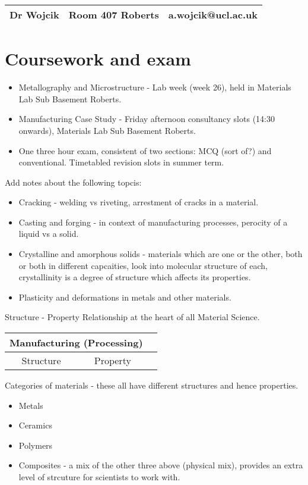 \documentclass[class=report, crop=false, 12pt,a4paper]{standalone}
\begin{document}
\begin{center}
  \begin{tabular}{ |c|c|c| } 
   \hline
   Dr Wojcik & Room 407 Roberts & a.wojcik@ucl.ac.uk \\ 
   \hline
  \end{tabular}
  \end{center}

\section{Coursework and exam}
\begin{itemize}
  \item Metallography and Microstructure - Lab week (week 26), held in Materials Lab Sub Basement Roberts.
  \item Manufacturing Case Study - Friday afternoon consultancy slots (14:30 onwards), Materials Lab Sub Basement Roberts.
  \item One three hour exam, consistent of two sections: MCQ (sort of?) and conventional. Timetabled revision slots in summer term.
\end{itemize}

Add notes about the following topcis: 

\begin{itemize}
  \item Cracking - welding vs riveting, arrestment of cracks in a material. 
  \item Casting and forging - in context of manufacturing processes, perocity of a liquid vs a solid.
  \item Crystalline and amorphous solids -  materials which are one or the other, both or both in different capcaities, look into molecular structure of each, crystallinity is a degree of structure which affects its properties.
  \item Plasticity and deformations in metals and other materials.
\end{itemize}

Structure - Property Relationship at the heart of all Material Science.

\begin{center}
  \begin{tabular}{ |c|c|c| } 
   \hline
    \multicolumn{2}{|c|}{Manufacturing (Processing)} \\
    \hline
    Structure & Property \\
   \hline
  \end{tabular}
\end{center}

Categories of materials - these all have different structures and hence properties.

\begin{itemize}[noitemsep]
  \item Metals
  \item Ceramics
  \item Polymers
  \item Composites - a mix of the other three above (physical mix), provides an extra level of strcuture for scientists to work with.
\end{itemize}
\end{document}
